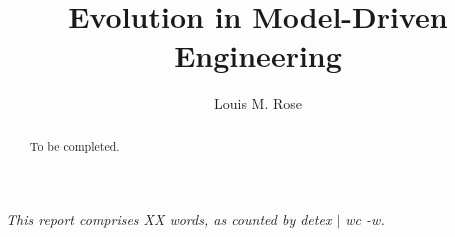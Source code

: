 \documentclass[a4paper,10pt]{article}
\title{Evolution in Model-Driven Engineering}
\author{Louis M. Rose}
\begin{document}
\maketitle

\begin{abstract}
	To be completed.
\end{abstract}

\vspace{2mm}

\begin{center}
  \small{\textit{This report comprises XX words, as counted by detex $|$ wc -w.}}
\end{center}

\tableofcontents

\newpage




\end{document}
